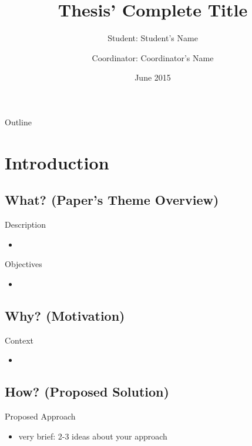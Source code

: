 \documentclass{beamer}
\title[Thesis' Short Title] 
{%
Thesis' Complete Title%
}
\author[Student's Name]
{
  Student: Student's Name\\  \and
  Coordinator: Coordinator's Name
}
\institute[Technical University of Cluj-Napoca]
{
  Technical University of Cluj-Napoca, Romania
}
\date[June 2015]
{June 2015}
\begin{document}
\begin{frame}
  \titlepage
\end{frame}

\begin{frame}{Outline}
  \tableofcontents
\end{frame}


\section{Introduction}

\subsection{What? (Paper's Theme Overview)}

\begin{frame}{Description}
	\begin{itemize}
		\item 
	\end{itemize}
\end{frame}


\begin{frame}{Objectives}
	\begin{itemize}
		\item 
	\end{itemize}
\end{frame}


\subsection{Why? (Motivation)}

\begin{frame}{Context}
	\begin{itemize}
		\item 
	\end{itemize}
\end{frame}

\subsection{How? (Proposed Solution)}

\begin{frame}{Proposed Approach}
	\begin{itemize}
		\item very brief: 2-3 ideas about your approach
	\end{itemize}    
\end{frame}
\end{document}
